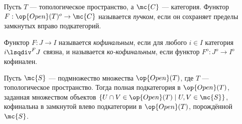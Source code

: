 \documentclass[
	extrafontsizes,
	11pt,
	hyphens,
]{memoir}
\begin{document}
\begin{definition}
Пусть \(T\) --- топологическое пространство, а \(\mc{C}\) --- категория.
Функтор \(F : \op{Open}(T)^o \to \mc{C}\) называется \emph{пучком}, если он сохраняет пределы замкнутых вправо подкатегорий.
\end{definition}

\begin{definition}
Функтор \(F : J \to I\) называется \emph{кофинальным}, если для любого \(i \in I\) категория \(i \lsqdiv^F J\) связна,
и называется \emph{ко-кофинальным}, если функтор \(F^o : J^o \to I^o\) кофинален.
\end{definition}

\begin{observation}
Пусть \(\mc{S}\) --- подмножество множества \(\op{Open}(T)\), где \(T\) --- топологическое пространство.
Тогда полная подкатегория в \(\op{Open}(T)\), заданная множеством объектов \(\{U \cap V \in \op{Open}(T) \mid U,V \in \mc{S}\}\), кофинальна в замкнутой влево подкатегории в \(\op{Open}(T)\), порождённой \(\mc{S}\).
\end{observation}
\end{document}
